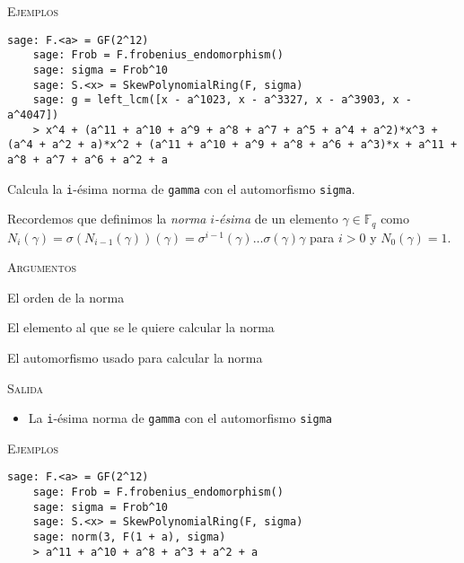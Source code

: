 \begin{description}[font=\ttfamily, style=nextline]
  \textsc{Ejemplos}
  \begin{lstlisting}[gobble=4]
    sage: F.<a> = GF(2^12)
    sage: Frob = F.frobenius_endomorphism()
    sage: sigma = Frob^10
    sage: S.<x> = SkewPolynomialRing(F, sigma)
    sage: g = left_lcm([x - a^1023, x - a^3327, x - a^3903, x - a^4047])
    > x^4 + (a^11 + a^10 + a^9 + a^8 + a^7 + a^5 + a^4 + a^2)*x^3 + (a^4 + a^2 + a)*x^2 + (a^11 + a^10 + a^9 + a^8 + a^6 + a^3)*x + a^11 + a^8 + a^7 + a^6 + a^2 + a
  \end{lstlisting}

  \item[norm(i, gamma, sigma)] Calcula la \texttt{i}-ésima norma de \texttt{gamma} con el automorfismo \texttt{sigma}.
  
  Recordemos que definimos la \emph{norma} \(i\)\emph{-ésima} de un elemento \(\gamma \in \mathbb F_q\) como \(N_i(\gamma) = \sigma(N_{i-1}(\gamma))(\gamma) = \sigma^{i-1}(\gamma)\dots \sigma(\gamma)\gamma\) para \(i > 0\) y \(N_0(\gamma) = 1\).
  
  \textsc{Argumentos}
  \begin{description}[font=\normalfont\ttfamily]
    \item[i] El orden de la norma
    \item[gamma] El elemento al que se le quiere calcular la norma
    \item[sigma] El automorfismo usado para calcular la norma  
  \end{description}

  \textsc{Salida}
  \begin{itemize}
    \item La \texttt{i}-ésima norma de \texttt{gamma} con el automorfismo \texttt{sigma}
  \end{itemize}
  
  \textsc{Ejemplos}
  \begin{lstlisting}[gobble=4]
    sage: F.<a> = GF(2^12)
    sage: Frob = F.frobenius_endomorphism()
    sage: sigma = Frob^10
    sage: S.<x> = SkewPolynomialRing(F, sigma)
    sage: norm(3, F(1 + a), sigma)
    > a^11 + a^10 + a^8 + a^3 + a^2 + a
  \end{lstlisting}
\end{description}